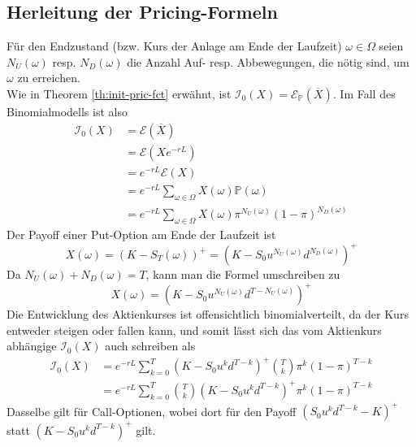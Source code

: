 \documentclass[11pt]{report} %
\begin{document}
\subsection{Herleitung der Pricing-Formeln}
Für den Endzustand (bzw. Kurs der Anlage am Ende der Laufzeit) $\omega \in \Omega$ seien $N_U(\omega)$ resp. $N_D(\omega)$ die Anzahl Auf- resp. Abbewegungen, die nötig sind, um $\omega$ zu erreichen. 
\\Wie in Theorem \ref{th:init-pric-fct} erwähnt, ist $\mathcal{I}_0(X)=\mathcal{E}_\mathbb{P}(\overline{X})$. Im Fall des Binomialmodells ist also \label{binom-modell-allg-form}
\begin{align*}
    \mathcal{I}_0(X)&=\mathcal{E}(\overline{X})\\
    &=\mathcal{E}(Xe^{-rL})\\
    &=e^{-rL}\mathcal{E}(X)\\
    &=e^{-rL}\sum_{\omega \in \Omega}X(\omega)\mathbb{P}(\omega)\\
    &=e^{-rL}\sum_{\omega \in \Omega}X(\omega)\pi^{N_U(\omega)}(1-\pi)^{N_D(\omega)}
\end{align*}
Der Payoff einer Put-Option am Ende der Laufzeit ist $$X(\omega)=(K-S_T(\omega))^+=(K-S_0u^{N_U(\omega)}d^{N_D(\omega)})^+$$
Da $N_U(\omega)+N_D(\omega)=T$, kann man die Formel umschreiben zu
$$X(\omega)=(K-S_0u^{N_U(\omega)}d^{T-N_U(\omega)})^+$$
Die Entwicklung des Aktienkurses ist offensichtlich binomialverteilt, da der Kurs entweder steigen oder fallen kann, und somit lässt sich das vom Aktienkurs abhängige $\mathcal{I}_0(X)$ auch schreiben als
\begin{align*}
    \mathcal{I}_0(X)&=e^{-rL}\sum_{k=0}^{T}(K-S_0u^{k}d^{T-k})^+\binom{T}{k}\pi^k(1-\pi)^{T-k}\\
    &=e^{-rL}\sum_{k=0}^{T}\binom{T}{k}(K-S_0u^{k}d^{T-k})^+\pi^k(1-\pi)^{T-k}
\end{align*}
Dasselbe gilt für Call-Optionen, wobei dort für den Payoff $(S_0u^{k}d^{T-k}-K)^+$ statt $(K-S_0u^{k}d^{T-k})^+$ gilt. 
\end{document}
